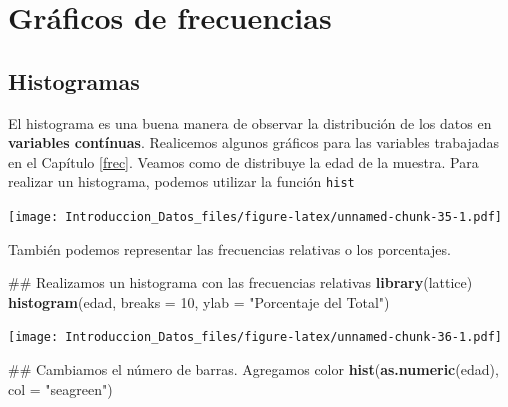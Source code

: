 \documentclass[spanish,]{book}
\newenvironment{Shaded}{\begin{snugshade}}{\end{snugshade}}
\newcommand{\KeywordTok}[1]{\textcolor[rgb]{0.13,0.29,0.53}{\textbf{#1}}}
\newcommand{\DataTypeTok}[1]{\textcolor[rgb]{0.13,0.29,0.53}{#1}}
\newcommand{\DecValTok}[1]{\textcolor[rgb]{0.00,0.00,0.81}{#1}}
\newcommand{\StringTok}[1]{\textcolor[rgb]{0.31,0.60,0.02}{#1}}
\newcommand{\OperatorTok}[1]{\textcolor[rgb]{0.81,0.36,0.00}{\textbf{#1}}}
\newcommand{\NormalTok}[1]{#1}
\begin{document}
\chapter{Gráficos de frecuencias}\label{graficos-de-frecuencias}

\section{Histogramas}\label{histogramas}

El histograma es una buena manera de observar la distribución de los
datos en \textbf{variables contínuas}. Realicemos algunos gráficos para
las variables trabajadas en el Capítulo \ref{frec}. Veamos como de
distribuye la edad de la muestra. Para realizar un histograma, podemos
utilizar la función \texttt{hist}

\begin{Shaded}
\end{Shaded}

\texttt{[image: Introduccion\_Datos\_files/figure-latex/unnamed-chunk-35-1.pdf]}

También podemos representar las frecuencias relativas o los porcentajes.

\begin{Shaded}
\begin{Highlighting}[]
\NormalTok{## Realizamos un histograma con las frecuencias relativas}
\KeywordTok{library}\NormalTok{(lattice)}
\KeywordTok{histogram}\NormalTok{(edad,}
          \DataTypeTok{breaks =} \DecValTok{10}\NormalTok{,}
          \DataTypeTok{ylab =} \StringTok{"Porcentaje del Total"}\NormalTok{)}
\end{Highlighting}
\end{Shaded}

\texttt{[image: Introduccion\_Datos\_files/figure-latex/unnamed-chunk-36-1.pdf]}

\begin{Shaded}
\begin{Highlighting}[]
\NormalTok{## Cambiamos el número de barras. Agregamos color}
\KeywordTok{hist}\NormalTok{(}\KeywordTok{as.numeric}\NormalTok{(edad),}
     \DataTypeTok{col =} \StringTok{"seagreen"}\NormalTok{)}
\end{Highlighting}
\end{Shaded}
\end{document}
